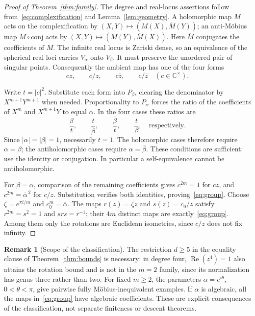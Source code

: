 \documentclass[11pt,a4paper]{article}
\theoremstyle{definition}
\newtheorem{remark}[theorem]{Remark}
\newcommand{\C}{\mathbb{C}}
\DeclareMathOperator{\Rea}{Re}
\begin{document}
\begin{proof}[Proof of Theorem~\ref{thm:family}]
The degree and real-locus assertions follow from~\eqref{eq:complexification}
and Lemma~\ref{lem:geometry}. A holomorphic map $M$ acts on the
complexification by $(X,Y)\mapsto(M(X),\overline M(Y))$;
an anti-M\"obius map $M\circ\mathrm{conj}$ acts by
$(X,Y)\mapsto(M(Y),\overline M(X))$.
Here $\overline M$ conjugates the coefficients of $M$.
The infinite real locus is Zariski dense, so an equivalence of the
spherical real loci carries $V_\alpha$ onto $V_\beta$.
It must preserve the unordered pair of singular points. Consequently
the ambient map has one of the four forms
\[
 cz,\qquad c/z,\qquad c\overline z,\qquad c/\overline z
 \quad(c\in\C^\times).
\]

Write $t=|c|^2$. Substitute each form into $P_\beta$, clearing the
denominator by $X^{m+1}Y^{m+1}$ when needed. Proportionality to
$P_\alpha$ forces the ratio of the coefficients of $X^m$ and
$X^{m+1}Y$ to equal $\alpha$. In the four cases these ratios are
\begin{equation}\label{eq:ratios}
 \frac{\beta}{t},\qquad \frac{t}{\overline\beta},\qquad
 \frac{\overline\beta}{t},\qquad \frac{t}{\beta},
 \quad\text{respectively}.
\end{equation}
Since $|\alpha|=|\beta|=1$, necessarily $t=1$.
The holomorphic cases therefore require $\alpha=\beta$; the
antiholomorphic cases require $\alpha=\overline\beta$.
These conditions are sufficient: use the identity or conjugation.
In particular a self-equivalence cannot be antiholomorphic.

For $\beta=\alpha$, comparison of the remaining coefficients gives
$c^{2m}=1$ for $cz$, and $c^{2m}=\overline\alpha^{\,2}$ for $c/z$.
Substitution verifies both identities, proving~\eqref{eq:group}.
Choose $\zeta=e^{\pi i/m}$ and $c_0^m=\overline\alpha$.
The maps $r(z)=\zeta z$ and $s(z)=c_0/z$ satisfy
$r^{2m}=s^2=1$ and $srs=r^{-1}$; their $4m$ distinct maps are
exactly~\eqref{eq:group}. Among them only the rotations are Euclidean
isometries, since $c/z$ does not fix infinity.
\end{proof}

\begin{remark}[Scope of the classification]\label{rem:scope}
The restriction $d\ge5$ in the equality clause of
Theorem~\ref{thm:bounds} is necessary: in degree four,
$\Rea(z^4)=1$ also attains the rotation bound and is not in the
$m=2$ family, since its normalization has genus three rather than two.
For fixed $m\ge2$, the parameters $\alpha=e^{i\theta}$,
$0<\theta<\pi$, give pairwise fully M\"obius-inequivalent examples.
If $\alpha$ is algebraic, all the maps in~\eqref{eq:group} have
algebraic coefficients. These are explicit consequences of the
classification, not separate finiteness or descent theorems.
\end{remark}
\end{document}
